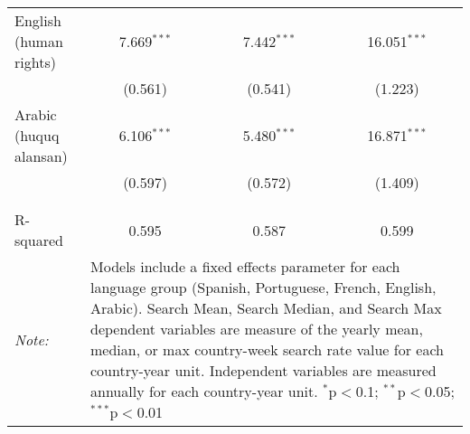 \begin{table}[!htbp]
\begin{tabular}{@{\extracolsep{5pt}}lccc}
  English (human rights) & 7.669$^{***}$ & 7.442$^{***}$ & 16.051$^{***}$ \\ 
  & (0.561) & (0.541) & (1.223) \\ 
  Arabic (huquq alansan) & 6.106$^{***}$ & 5.480$^{***}$ & 16.871$^{***}$ \\ 
  & (0.597) & (0.572) & (1.409) \\ 
 \hline \\[-1.8ex] 
\hline 
\hline \\[-1.8ex] 
R-squared  & 0.595 & 0.587 & 0.599 \\ 
\textit{Note:}  & \multicolumn{3}{l}{\parbox[t]{8cm}{Models include a fixed effects parameter for each language group (Spanish, Portuguese, French, English, Arabic). Search Mean, Search Median, and Search Max dependent variables are measure of the yearly mean, median, or max country-week search rate value for each country-year unit. Independent variables are measured annually for each country-year unit. $^{*}$p$<$0.1; $^{**}$p$<$0.05; $^{***}$p$<$0.01}} \\ 
\end{tabular} 
\end{table} 
